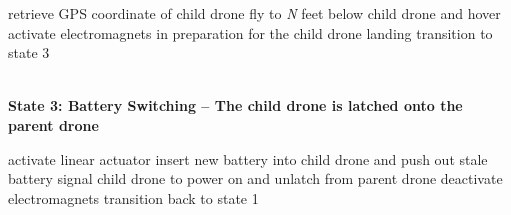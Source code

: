 \documentclass[paper=a4, fontsize=10pt]{scrartcl}
\begin{document}
\begin{algorithm}[H]
	retrieve GPS coordinate of child drone\;
	fly to \textit{N} feet below child drone and hover\;
    activate electromagnets in preparation for the child drone landing\;
	transition to state 3\;
\end{algorithm}
\hfill\\%
\textbf{State 3: Battery Switching -- The child drone is latched onto the parent drone}\\%
\begin{algorithm}[H]
	activate linear actuator\;
	insert new battery into child drone and push out stale battery\;
	signal child drone to power on and unlatch from parent drone\;
	deactivate electromagnets\;
	transition back to state 1\;
\end{algorithm}

\newpage
\end{document}
